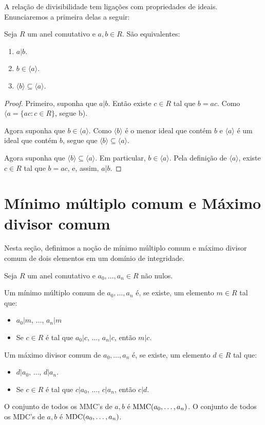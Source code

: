 A relação de divisibilidade tem ligações com propriedades de ideais.
Enunciaremos a primeira delas a seguir:

\begin{prop}
Seja $R$ um anel comutativo e $a, b \in R$.
São equivalentes:
\begin{enumerate}[label=\alph*)]
    \item $a|b$.
    \item $b \in \langle a \rangle$.
    \item $\langle b\rangle \subseteq \langle a \rangle$.
\end{enumerate}
\end{prop}
\begin{proof}
    Primeiro, suponha que $a|b$.
    Então existe $c \in R$ tal que $b=ac$.
    Como $\langle a=\{ac: c \in R\}$, segue b).

    Agora suponha que $b \in \langle a\rangle$.
    Como $\langle b\rangle$ é o menor ideal que contém $b$ e $\langle a\rangle$ é um ideal que contém $b$, segue que $\langle b\rangle \subseteq \langle a\rangle$.

    Agora suponha que $\langle b\rangle \subseteq \langle a\rangle$.
    Em particular, $b \in \langle a\rangle$.
    Pela definição de $\langle a \rangle$, existe $c \in R$ tal que $b=ac$, e, assim, $a|b$.
\end{proof}

\section{Mínimo múltiplo comum e Máximo divisor comum}

Nesta seção, definimos a noção de mínimo múltiplo comum e máximo divisor comum de dois elementos em um domínio de integridade.
\begin{definition}
Seja $R$ um anel comutativo e $a_0, \dots, a_n \in R$ não nulos.

Um mínimo múltiplo comum de $a_0, \dots, a_n$ é, se existe, um elemento $m\in R$ tal que:
\begin{itemize}
    \item $a_0|m$, $\dots$, $a_n|m$
    \item Se $c\in R$ é tal que $a_0|c$, $\dots$, $a_n|c$, então $m|c$.
\end{itemize}

Um máximo divisor comum de $a_0, \dots, a_n$ é, se existe, um elemento $d\in R$ tal que:
\begin{itemize}
    \item $d|a_0$, $\dots$, $d|a_n$.
    \item Se $c\in R$ é tal que $c|a_0$, $\dots$,  $c|a_n$, então $c|d$.
\end{itemize}

O conjunto de todos os MMC's de $a, b$ é $\operatorname{MMC}(a_0, \dots, a_n)$.
O conjunto de todos os MDC's de $a, b$ é $\operatorname{MDC}(a_0, \dots, a_n)$.
\end{definition}

